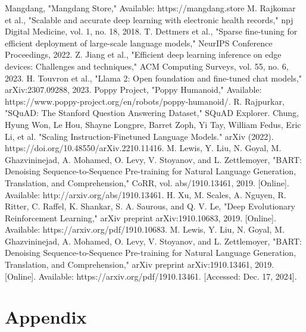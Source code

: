 \documentclass[conference]{IEEEtran}
\begin{document}
\begin{thebibliography}{00}
 Mangdang, "Mangdang Store," Available: https://mangdang.store
 M. Rajkomar et al., "Scalable and accurate deep learning with electronic health records," npj Digital Medicine, vol. 1, no. 18, 2018.
 T. Dettmers et al., "Sparse fine-tuning for efficient deployment of large-scale language models," NeurIPS Conference Proceedings, 2022.
 Z. Jiang et al., "Efficient deep learning inference on edge devices: Challenges and techniques," ACM Computing Surveys, vol. 55, no. 6, 2023.
 H. Touvron et al., "Llama 2: Open foundation and fine-tuned chat models," arXiv:2307.09288, 2023.
 Poppy Project, "Poppy Humanoid," Available: https://www.poppy-project.org/en/robots/poppy-humanoid/.
 R. Rajpurkar, "SQuAD: The Stanford Question Answering Dataset," SQuAD Explorer.
 Chung, Hyung Won, Le Hou, Shayne Longpre, Barret Zoph, Yi Tay, William Fedus, Eric Li, et al. "Scaling Instruction-Finetuned Language Models." arXiv (2022). https://doi.org/10.48550/arXiv.2210.11416.
 M. Lewis, Y. Liu, N. Goyal, M. Ghazvininejad, A. Mohamed, O. Levy, V. Stoyanov, and L. Zettlemoyer, "BART: Denoising Sequence-to-Sequence Pre-training for Natural Language Generation, Translation, and Comprehension," CoRR, vol. abs/1910.13461, 2019. [Online]. Available: http://arxiv.org/abs/1910.13461.
 H. Xu, M. Scales, A. Nguyen, R. Ritter, C. Raffel, K. Shankar, S. A. Saurous, and Q. V. Le, "Deep Evolutionary Reinforcement Learning," arXiv preprint arXiv:1910.10683, 2019. [Online]. Available: https://arxiv.org/pdf/1910.10683.
 M. Lewis, Y. Liu, N. Goyal, M. Ghazvininejad, A. Mohamed, O. Levy, V. Stoyanov, and L. Zettlemoyer, "BART: Denoising Sequence-to-Sequence Pre-training for Natural Language Generation, Translation, and Comprehension," arXiv preprint arXiv:1910.13461, 2019. [Online]. Available: https://arxiv.org/pdf/1910.13461. [Accessed: Dec. 17, 2024].
\end{thebibliography}

\newpage
\onecolumn
\appendix
\section{Appendix}
\end{document}
